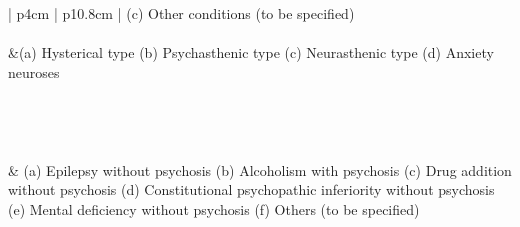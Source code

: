 \begin{longtable}[!t]{ | p{4cm} | p{10.8cm} | }
(c) Other conditions (to be specified) \\
 \\ \hline
 &(a) Hysterical type \newline
(b) Psychasthenic type \newline
(c) Neurasthenic type \newline
(d) Anxiety neuroses \\
 \\ \hline
{} \\ \hline
{} \\ \hline
{} \\ \hline
 & (a) Epilepsy without psychosis \newline
(b) Alcoholism with psychosis \newline
(c) Drug addition without psychosis \newline
(d) Constitutional psychopathic inferiority without psychosis \newline
(e) Mental deficiency without psychosis \newline
(f) Others (to be specified)\\ \hline
\caption{\emph{Statistical Manual for the Use of Institutions for the Insane classification of insanity}, 1918}
\label{table: 1918Classification}
\end{longtable}


